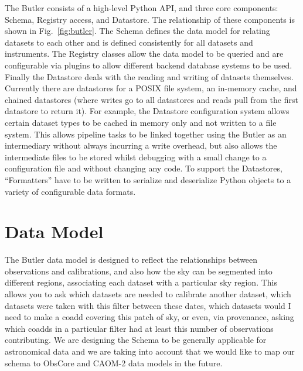 \documentclass[11pt,twoside]{article}
\begin{document}
The Butler consists of a high-level Python API, and three core components: Schema, Registry access, and Datastore.
The relationship of these components is shown in Fig.~\ref{fig:butler}.
The Schema defines the data model for relating datasets to each other and is defined consistently for all datasets and instruments.
The Registry classes allow the data model to be queried and are configurable via plugins to allow different backend database systems to be used.
Finally the Datastore deals with the reading and writing of datasets themselves.
Currently there are datastores for a POSIX file system, an in-memory cache, and chained datastores (where writes go to all datastores and reads pull from the first datastore to return it).
For example, the Datastore configuration system allows certain dataset types to be cached in memory only and not written to a file system.
This allows pipeline tasks to be linked together using the Butler as an intermediary without always incurring a write overhead, but also allows the intermediate files to be stored whilst debugging with a small change to a configuration file and without changing any code.
To support the Datastores, ``Formatters'' have to be written to serialize and deserialize Python objects to a variety of configurable data formats.


\section{Data Model}

The Butler data model is designed to reflect the relationships between observations and calibrations, and also how the sky can be segmented into different regions, associating each dataset with a particular sky region.
This allows you to ask which datasets are needed to calibrate another dataset, which datasets were taken with this filter between these dates, which datasets would I need to make a coadd covering this patch of sky, or even, via provenance, asking which coadds in a particular filter had at least this number of observations contributing.
We are designing the Schema to be generally applicable for astronomical data and we are taking into account that we would like to map our schema to ObsCore \citep{2017ivoa.spec.0509L} and CAOM-2 \citep{2012ASPC..461..339D} data models in the future.
\end{document}

